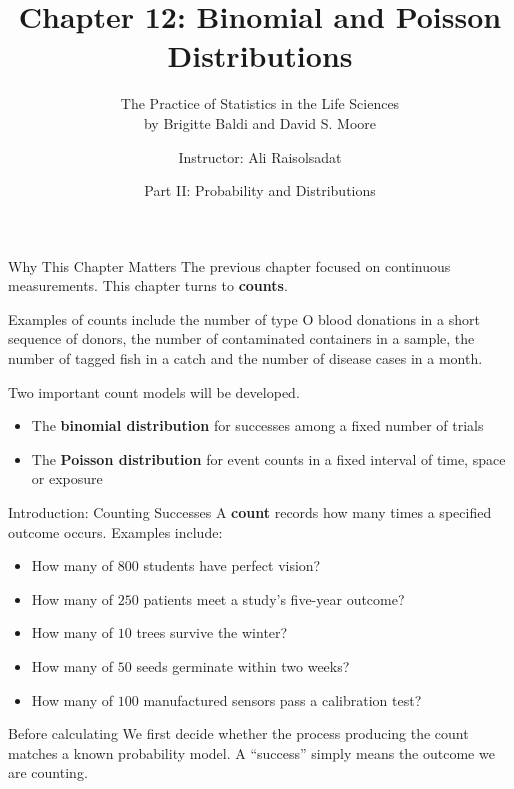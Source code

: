 \documentclass[aspectratio=169]{beamer}
\title[Chapter 12: Binomial and Poisson Distributions]{\textbf{Chapter 12: Binomial and Poisson Distributions}}
\subtitle{The Practice of Statistics in the Life Sciences \\ by Brigitte Baldi and David S. Moore}
\author{Instructor: Ali Raisolsadat}
\date{Part II: Probability and Distributions}
\begin{document}
\begin{frame}
  \titlepage
\end{frame}

\begin{frame}{Why This Chapter Matters}
The previous chapter focused on continuous measurements. This chapter turns to \textbf{counts}.

\vspace{0.2cm}
Examples of counts include the number of type O blood donations in a short sequence of donors, the number of contaminated containers in a sample, the number of tagged fish in a catch and the number of disease cases in a month.

\vspace{0.2cm}
Two important count models will be developed.
\begin{itemize}
  \item The \textbf{binomial distribution} for successes among a fixed number of trials
  \item The \textbf{Poisson distribution} for event counts in a fixed interval of time, space or exposure
\end{itemize}
\end{frame}

\begin{frame}{Introduction: Counting Successes}
A \textbf{count} records how many times a specified outcome occurs. Examples include:
\begin{itemize}
	\item How many of $800$ students have perfect vision?
  	\item How many of $250$ patients meet a study's five-year outcome?
  	\item How many of $10$ trees survive the winter?
  	\item How many of $50$ seeds germinate within two weeks?
  	\item How many of $100$ manufactured sensors pass a calibration test?
\end{itemize}

\begin{block}{Before calculating}
We first decide whether the process producing the count matches a known probability model. A ``success'' simply means the outcome we are counting.
\end{block}
\end{frame}
\end{document}
